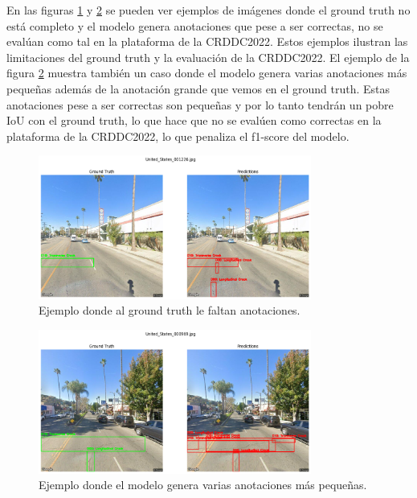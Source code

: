 En las figuras \ref{fig:ground_truth_example_1} y \ref{fig:ground_truth_example_4} se pueden ver ejemplos de imágenes donde el ground truth no está completo y el modelo genera anotaciones que pese a ser correctas, no se evalúan como tal en la plataforma de la CRDDC2022. Estos ejemplos ilustran las limitaciones del ground truth y la evaluación de la CRDDC2022. El ejemplo de la figura \ref{fig:ground_truth_example_4} muestra también un caso donde el modelo genera varias anotaciones más pequeñas además de la anotación grande que vemos en el ground truth. Estas anotaciones pese a ser correctas son pequeñas y por lo tanto tendrán un pobre IoU con el ground truth, lo que hace que no se evalúen como correctas en la plataforma de la CRDDC2022, lo que penaliza el f1-score del modelo.

\begin{figure}[H]
    \centering
    \includegraphics[width=0.8\textwidth]{img/ground_truth_example_1.png}
    \caption{Ejemplo donde al ground truth le faltan anotaciones.}
    \label{fig:ground_truth_example_1}
\end{figure}

\begin{figure}[H]
    \centering
    \includegraphics[width=0.8\textwidth]{img/ground_truth_example_4.png}
    \caption{Ejemplo donde el modelo genera varias anotaciones más pequeñas.}
    \label{fig:ground_truth_example_4}
\end{figure}

